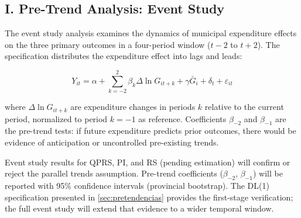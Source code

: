 \subsection*{I. Pre-Trend Analysis: Event Study}
\label{sec:appendix_pretendencias}

The event study analysis examines the dynamics of municipal expenditure effects on the three primary outcomes in a four-period window ($t-2$ to $t+2$).
The specification distributes the expenditure effect into lags and leads:

\begin{equation}
  Y_{it} = \alpha + \sum_{k=-2}^{2} \beta_k \Delta \ln G_{it+k} + \gamma \bar{G}_{i} + \delta_{t} + \varepsilon_{it}
  \label{eq:event_study}
\end{equation}

\noindent where $\Delta \ln G_{it+k}$ are expenditure changes in periods $k$ relative to the current period, normalized to period $k = -1$ as reference.
Coefficients $\beta_{-2}$ and $\beta_{-1}$ are the pre-trend tests: if future expenditure predicts prior outcomes, there would be evidence of anticipation or uncontrolled pre-existing trends.

Event study results for QPRS, PI, and RS (pending estimation) will confirm or reject the parallel trends assumption.
Pre-trend coefficients ($\beta_{-2}$, $\beta_{-1}$) will be reported with 95\% confidence intervals (provincial bootstrap).
The DL(1) specification presented in \cref{sec:pretendencias} provides the first-stage verification; the full event study will extend that evidence to a wider temporal window.
